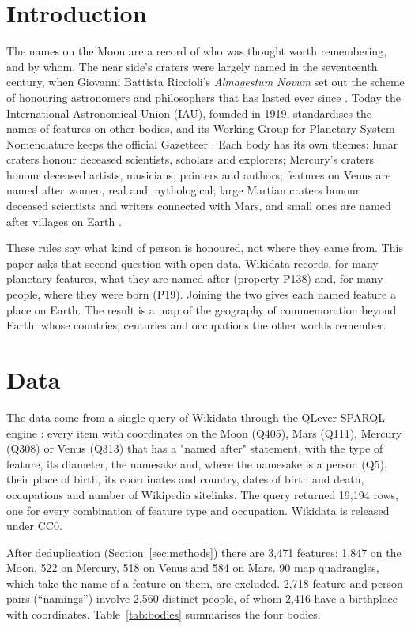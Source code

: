 \documentclass[11pt,a4paper]{article}
\begin{document}
\section{Introduction}
The names on the Moon are a record of who was thought worth remembering, and by whom. The near side's craters were largely named in the seventeenth century, when Giovanni Battista Riccioli's \textit{Almagestum Novum} \citep{riccioli} set out the scheme of honouring astronomers and philosophers that has lasted ever since \citep{whitaker}. Today the International Astronomical Union (IAU), founded in 1919, standardises the names of features on other bodies, and its Working Group for Planetary System Nomenclature keeps the official Gazetteer \citep{gazetteer}. Each body has its own themes: lunar craters honour deceased scientists, scholars and explorers; Mercury's craters honour deceased artists, musicians, painters and authors; features on Venus are named after women, real and mythological; large Martian craters honour deceased scientists and writers connected with Mars, and small ones are named after villages on Earth \citep{gazetteer}.

These rules say what kind of person is honoured, not where they came from. This paper asks that second question with open data. Wikidata \citep{wikidata} records, for many planetary features, what they are named after (property P138) and, for many people, where they were born (P19). Joining the two gives each named feature a place on Earth. The result is a map of the geography of commemoration beyond Earth: whose countries, centuries and occupations the other worlds remember.

\section{Data}
The data come from a single query of Wikidata through the QLever SPARQL engine \citep{qlever}: every item with coordinates on the Moon (Q405), Mars (Q111), Mercury (Q308) or Venus (Q313) that has a "named after" statement, with the type of feature, its diameter, the namesake and, where the namesake is a person (Q5), their place of birth, its coordinates and country, dates of birth and death, occupations and number of Wikipedia sitelinks. The query returned 19,194 rows, one for every combination of feature type and occupation. Wikidata is released under CC0.

After deduplication (Section~\ref{sec:methods}) there are 3,471 features: 1,847 on the Moon, 522 on Mercury, 518 on Venus and 584 on Mars. 90 map quadrangles, which take the name of a feature on them, are excluded. 2,718 feature and person pairs (``namings'') involve 2,560 distinct people, of whom 2,416 have a birthplace with coordinates. Table~\ref{tab:bodies} summarises the four bodies.
\end{document}
